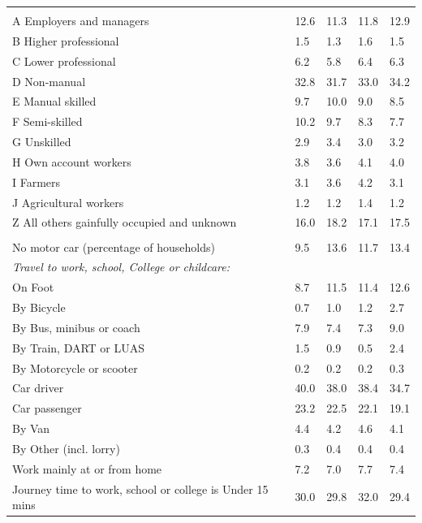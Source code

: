 \documentclass{article}
\begin{document}
\begin{table}[h]
\begin{tabular}{KTTTT}
\hline
    \\ 
    \hline
A Employers and managers & 12.6& 11.3& 11.8& 12.9\\
B Higher professional & 1.5& 1.3& 1.6& 1.5\\
C Lower professional & 6.2& 5.8& 6.4& 6.3\\
D Non-manual & 32.8& 31.7& 33.0& 34.2\\
E Manual skilled &  9.7& 10.0&  9.0&  8.5\\
F Semi-skilled & 10.2&  9.7&  8.3&  7.7\\
G Unskilled & 2.9& 3.4& 3.0& 3.2\\
H Own account workers & 3.8& 3.6& 4.1& 4.0\\
I Farmers & 3.1& 3.6& 4.2& 3.1\\
J Agricultural workers & 1.2& 1.2& 1.4& 1.2\\
Z All others gainfully occupied and unknown & 16.0& 18.2& 17.1& 17.5\\
\hline
{}\hline
    \\ 
    \hline
No motor car (percentage of households) &  9.5& 13.6& 11.7& 
13.4\\
    \hline 
\emph{Travel to work, school, College or childcare:} & & & \\
\quad On Foot &  8.7& 11.5& 11.4& 12.6\\ 
\quad By Bicycle & 0.7& 1.0& 1.2& 2.7\\ 
\quad By Bus, minibus or coach & 7.9& 7.4& 7.3& 9.0\\
\quad By Train, DART or LUAS & 1.5& 0.9& 0.5& 2.4\\
\quad By Motorcycle or scooter & 0.2& 0.2& 0.2& 0.3\\
\quad Car driver & 40.0 & 38.0& 38.4& 34.7\\
\quad Car passenger & 23.2& 22.5& 22.1& 19.1\\
\quad By Van & 4.4& 4.2& 4.6& 4.1\\
\quad By Other (incl. lorry) & 0.3& 0.4& 0.4& 0.4\\
    \hline
Work mainly at or from home & 7.2& 7.0& 7.7& 7.4\\
Journey time to work, school or college is Under 15 mins & 30.0& 29.8& 32.0& 29.4\\

\end{tabular}
\end{table}
\end{document}

